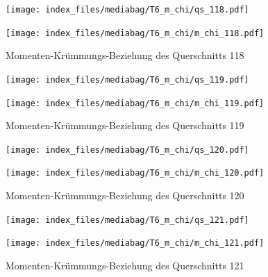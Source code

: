 \documentclass[
  11pt,
  letterpaper,
]{scrreprt}
\begin{document}
\begin{figure}[H]

\begin{minipage}{0.50\linewidth}
\texttt{[image: index\_files/mediabag/T6\_m\_chi/qs\_118.pdf]}\end{minipage}%
%
\begin{minipage}{0.50\linewidth}
\texttt{[image: index\_files/mediabag/T6\_m\_chi/m\_chi\_118.pdf]}\end{minipage}%

\caption{\label{fig-mchi_anhang}Momenten-Krümmungs-Beziehung des
Querschnitts 118}

\end{figure}%

\begin{figure}[H]

\begin{minipage}{0.50\linewidth}
\texttt{[image: index\_files/mediabag/T6\_m\_chi/qs\_119.pdf]}\end{minipage}%
%
\begin{minipage}{0.50\linewidth}
\texttt{[image: index\_files/mediabag/T6\_m\_chi/m\_chi\_119.pdf]}\end{minipage}%

\caption{\label{fig-mchi_anhang}Momenten-Krümmungs-Beziehung des
Querschnitts 119}

\end{figure}%

\begin{figure}[H]

\begin{minipage}{0.50\linewidth}
\texttt{[image: index\_files/mediabag/T6\_m\_chi/qs\_120.pdf]}\end{minipage}%
%
\begin{minipage}{0.50\linewidth}
\texttt{[image: index\_files/mediabag/T6\_m\_chi/m\_chi\_120.pdf]}\end{minipage}%

\caption{\label{fig-mchi_anhang}Momenten-Krümmungs-Beziehung des
Querschnitts 120}

\end{figure}%

\begin{figure}[H]

\begin{minipage}{0.50\linewidth}
\texttt{[image: index\_files/mediabag/T6\_m\_chi/qs\_121.pdf]}\end{minipage}%
%
\begin{minipage}{0.50\linewidth}
\texttt{[image: index\_files/mediabag/T6\_m\_chi/m\_chi\_121.pdf]}\end{minipage}%

\caption{\label{fig-mchi_anhang}Momenten-Krümmungs-Beziehung des
Querschnitts 121}

\end{figure}%
\end{document}
